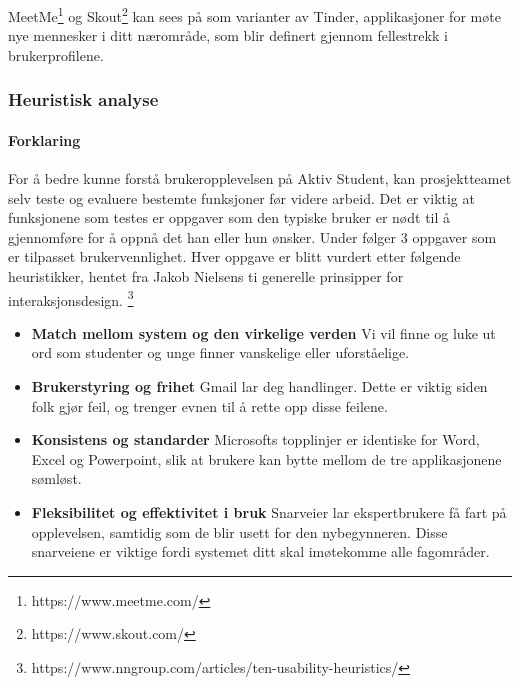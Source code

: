 MeetMe\footnote{https://www.meetme.com/} og Skout\footnote{https://www.skout.com/} kan sees på som varianter av Tinder, applikasjoner for møte nye mennesker i ditt nærområde, som blir definert gjennom fellestrekk i brukerprofilene.

\subsubsection{Heuristisk analyse}

\paragraph{Forklaring}

For å bedre kunne forstå brukeropplevelsen på Aktiv Student, kan prosjektteamet selv teste og evaluere bestemte funksjoner før videre arbeid. Det er viktig at funksjonene som testes er oppgaver som den typiske bruker er nødt til å gjennomføre for å oppnå det han eller hun ønsker.
\linebreak 
Under følger 3 oppgaver som er tilpasset brukervennlighet. Hver oppgave er blitt vurdert etter følgende heuristikker, hentet fra Jakob Nielsens ti generelle prinsipper for interaksjonsdesign. \footnote{https://www.nngroup.com/articles/ten-usability-heuristics/}

 \begin{itemize}
    \item \textbf{Match mellom system og den virkelige verden}   %
           Vi vil finne og luke ut ord som studenter og unge finner vanskelige eller uforståelige.   %
    \item \textbf{Brukerstyring og frihet} 
             Gmail lar deg  handlinger. Dette er viktig siden folk gjør feil, og trenger evnen til å rette opp disse feilene.
    \item \textbf{Konsistens og standarder}  %
            Microsofts topplinjer er identiske for Word, Excel og Powerpoint, slik at brukere kan bytte mellom de tre applikasjonene sømløst.   %
    \item \textbf{Fleksibilitet og effektivitet i bruk} 
            Snarveier lar ekspertbrukere få fart på opplevelsen, samtidig som de blir usett for den nybegynneren. Disse snarveiene er viktige fordi systemet ditt skal imøtekomme alle fagområder.
\end{itemize}


